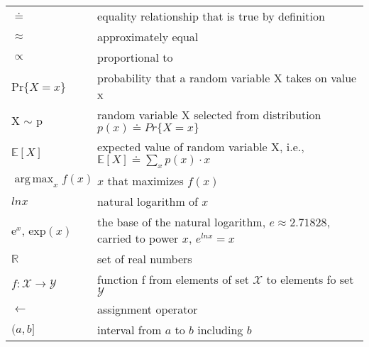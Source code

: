 \documentclass[10pt, landscape, a4paper]{article}
\DeclareMathOperator*{\argmax}{arg\,max}
\begin{document}
\begin{multicols}{3}
        \begin{tabular}{ p{} p{} }
            $\doteq$                                 & equality relationship that is true by definition                                          \\
            $\approx$                                & approximately equal                                                                       \\
            $\propto$                                & proportional to                                                                           \\
            Pr$\{X=x\}$                              & probability that a random variable X takes on value x                                     \\
            X $\sim$ p                               & random variable X selected from distribution $p(x)\doteq Pr\{X=x\}$                       \\
            $\mathbb{E}[X]$                          & expected value of random variable X, i.e., $\mathbb{E}[X]\doteq \sum_{x}p(x)\cdot x$      \\
            $\argmax_{x} f(x)$                       & $x$ that maximizes $f(x)$                                                                 \\
            $ln x$                                   & natural logarithm of $x$                                                                  \\
            $\mathrm{e}^x$, $\mathrm{exp}(x)$        & the base of the natural logarithm, $e\approx 2.71828$, carried to power $x$, $e^{ln x}=x$ \\
            $\mathbb{R}$                             & set of real numbers                                                                       \\
            $f: \mathcal{X} \rightarrow \mathcal{Y}$ & function f from elements of set $\mathcal{X}$ to elements fo set $\mathcal{Y}$            \\
            $\leftarrow$                             & assignment operator                                                                       \\
            $(a,b]$                                  & interval from $a$ to $b$ including $b$                                                    \\
        \end{tabular}


\end{multicols}
\end{document}
